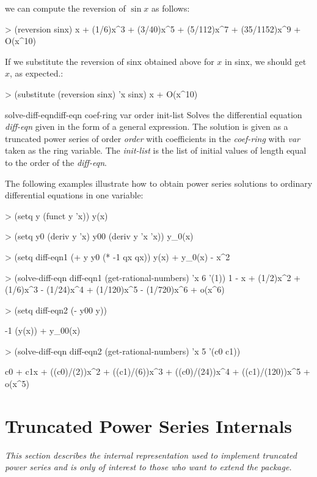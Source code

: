 \noindent
we can compute the reversion of $\sin x$ as follows:
\begin{code}
> (reversion sinx)
x + (1/6)x^3 + (3/40)x^5 + (5/112)x^7 + (35/1152)x^9 + O(x^10)
\end{code}

\noindent
If we substitute the reversion of {\sf sinx} obtained above
for $x$ in {\sf sinx}, we should get $x$, as expected.:
\begin{code}
> (substitute (reversion sinx) 'x sinx)
x + O(x^10)
\end{code}
  
\begin{functiondef}{solve-diff-eqn}{diff-eqn coef-ring var order init-list}
Solves the differential equation {\em diff-eqn}
given in the form of a general expression. The solution
is given as a truncated power series of order {\em order}
with coefficients in the {\em coef-ring} with {\em var} taken as
the ring variable. The {\em init-list} is the list of initial
values of length equal to the order of the {\em diff-eqn}.
\end{functiondef}
  
The following examples illustrate how to obtain power
series solutions to ordinary differential equations
in one variable:
\begin{code}
> (setq y (funct y 'x))
y(x)

> (setq y0 (deriv y 'x) y00 (deriv y 'x 'x))
y_{0}(x)
  
> (setq diff-eqn1 (+ y y0 (* -1 qx qx))
y(x) + y_{0}(x) - x^2
  
> (solve-diff-eqn diff-eqn1 (get-rational-numbers) 'x 6 '(1))
1 - x + (1/2)x^2 + (1/6)x^3 - (1/24)x^4 + (1/120)x^5 - (1/720)x^6 + o(x^6)
  
> (setq diff-eqn2 (- y00 y))
  
-1 (y(x)) + y_{00}(x)
  
> (solve-diff-eqn diff-eqn2 (get-rational-numbers) 'x 5 '(c0 c1))
  
c0 + c1x + ((c0)/(2))x^2 + ((c1)/(6))x^3 + ((c0)/(24))x^4 + ((c1)/(120))x^5 + o(x^5)
\end{code}  


\section{Truncated Power Series Internals}
  
{\em This section describes the internal representation used to
implement truncated power series and is only of interest to those who
want to extend the package.}

